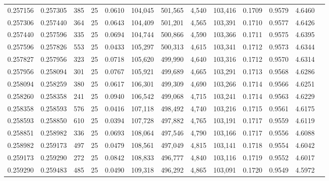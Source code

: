 \begin{tabular}{rrrrrrrrrrrrr}
0.257156 & 0.257305 &   385 &  25 &                                     0.0610 & 104,045 & 501,565 &   4,540 & 103,416 & 0.1709 & 0.9579 & 4.6460 \\
0.257306 & 0.257440 &   364 &  25 &                                     0.0643 & 104,409 & 501,201 &   4,565 & 103,391 & 0.1710 & 0.9577 & 4.6426 \\
0.257440 & 0.257596 &   335 &  25 &                                     0.0694 & 104,744 & 500,866 &   4,590 & 103,366 & 0.1711 & 0.9575 & 4.6395 \\
0.257596 & 0.257826 &   553 &  25 &                                     0.0433 & 105,297 & 500,313 &   4,615 & 103,341 & 0.1712 & 0.9573 & 4.6344 \\
0.257827 & 0.257956 &   323 &  25 &                                     0.0718 & 105,620 & 499,990 &   4,640 & 103,316 & 0.1712 & 0.9570 & 4.6314 \\
0.257956 & 0.258094 &   301 &  25 &                                     0.0767 & 105,921 & 499,689 &   4,665 & 103,291 & 0.1713 & 0.9568 & 4.6286 \\
0.258094 & 0.258259 &   380 &  25 &                                     0.0617 & 106,301 & 499,309 &   4,690 & 103,266 & 0.1714 & 0.9566 & 4.6251 \\
0.258260 & 0.258358 &   241 &  25 &                                     0.0940 & 106,542 & 499,068 &   4,715 & 103,241 & 0.1714 & 0.9563 & 4.6229 \\
0.258358 & 0.258593 &   576 &  25 &                                     0.0416 & 107,118 & 498,492 &   4,740 & 103,216 & 0.1715 & 0.9561 & 4.6175 \\
0.258593 & 0.258850 &   610 &  25 &                                     0.0394 & 107,728 & 497,882 &   4,765 & 103,191 & 0.1717 & 0.9559 & 4.6119 \\
0.258851 & 0.258982 &   336 &  25 &                                     0.0693 & 108,064 & 497,546 &   4,790 & 103,166 & 0.1717 & 0.9556 & 4.6088 \\
0.258982 & 0.259173 &   497 &  25 &                                     0.0479 & 108,561 & 497,049 &   4,815 & 103,141 & 0.1718 & 0.9554 & 4.6042 \\
0.259173 & 0.259290 &   272 &  25 &                                     0.0842 & 108,833 & 496,777 &   4,840 & 103,116 & 0.1719 & 0.9552 & 4.6017 \\
0.259290 & 0.259483 &   485 &  25 &                                     0.0490 & 109,318 & 496,292 &   4,865 & 103,091 & 0.1720 & 0.9549 & 4.5972 \\

\end{tabular}
